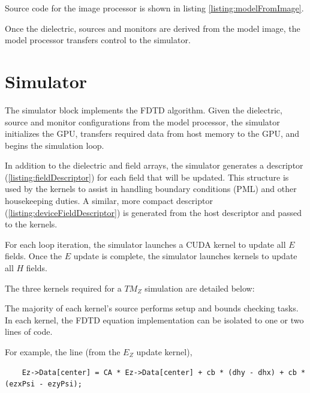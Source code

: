 Source code for the image processor is shown in listing \autoref{listing:modelFromImage}.

\label{listing:modelFromImage}

Once the dielectric, sources and monitors are derived from the model image, the model processor transfers control to the simulator.

\section{Simulator}\label{sec:simulator}

The simulator block implements the FDTD algorithm. Given the dielectric, source and monitor configurations from the model processor, the simulator initializes the GPU, transfers required data from host memory to the GPU, and begins the simulation loop.

In addition to the dielectric and field arrays, the simulator generates a  descriptor (\autoref{listing:fieldDescriptor}) for each field that will be updated. This structure is used by the kernels to assist in handling boundary conditions (PML) and other housekeeping duties. A similar, more compact  descriptor (\autoref{listing:deviceFieldDescriptor}) is generated from the host descriptor and passed to the kernels.

\label{listing:fieldDescriptor}

\label{listing:deviceFieldDescriptor}

For each loop iteration, the simulator launches a CUDA kernel to update all $E$ fields. Once the $E$ update is complete, the simulator launches kernels to update all $H$ fields.

The three kernels required for a $TM_Z$ simulation are detailed below:

\label{listing:updateEzCpp}

The majority of each kernel's source performs setup and bounds checking tasks. In each kernel, the FDTD equation implementation can be isolated to one or two lines of code.

For example, the line (from the $E_Z$ update kernel),

\begin{lstlisting}
	Ez->Data[center] = CA * Ez->Data[center] + cb * (dhy - dhx) + cb * (ezxPsi - ezyPsi);
\end{lstlisting}

